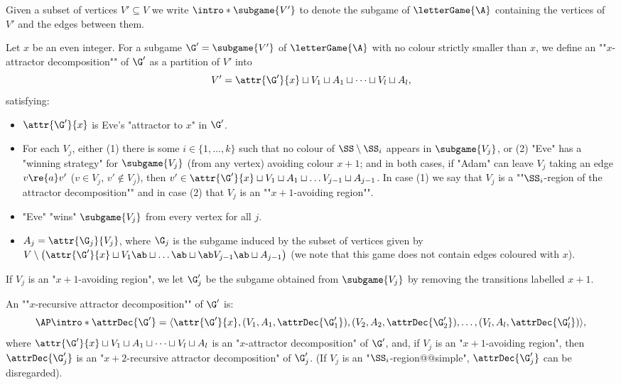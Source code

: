 \documentclass{theoretics}
\begin{document}
\AP Given a subset of vertices $V'\subseteq V$ we write $\intro*\subgame{V'}$ to denote the subgame of $\letterGame{\A}$ containing the vertices of $V'$ and the edges between them.

\AP Let $x$ be an even integer. For a subgame $\G' = \subgame{V'}$ of $\letterGame{\A}$ with no colour strictly smaller than $x$, we define an ""$x$-attractor decomposition"" of $\G'$ as  a partition of $V'$ into 
\[V' =\attr{\G'}{x} \sqcup V_1 \sqcup A_1 \sqcup \dots\sqcup V_l \sqcup A_l,\] 
satisfying:
\begin{itemize}
	\item \AP $\attr{\G'}{x}$ is Eve's "attractor to $x$" in $\G'$. 
	
	\item For each $V_j$, either (1) there is some $i\in \{1,\dots, k\}$ such that no colour of $\SS\setminus \SS_i$ appears in $\subgame{V_j}$, or (2) "Eve" has a "winning strategy" for $\subgame{V_j}$ (from any vertex) avoiding colour $x+1$; and in both cases, if "Adam" can leave $V_j$ taking an edge $v\re{a} v'$ ($v\in V_j$, $v'\notin V_j$), then $v'\in \attr{\G'}{x} \sqcup V_1 \sqcup A_1 \sqcup \dots  V_{j-1} \sqcup A_{j-1}$.
	In case (1) we say that $V_j$ is a ""$\SS_i$-region of the attractor decomposition"" and in case (2) that $V_j$ is an ""$x+1$-avoiding region"".
	
	\item "Eve" "wins" $\subgame{V_j}$ from every vertex for all $j$.
	
	\item $A_j = \attr{\G_j}{V_j}$, where $\G_j$ is the subgame induced by the subset of vertices given by $V\setminus \left(\attr{\G'}{x} \sqcup V_1 \ab \sqcup \dots \ab\sqcup\ab V_{j-1}\ab \sqcup A_{j-1}\right)$ (we note that this game does not contain edges coloured with $x$).
		
\end{itemize}

If $V_j$ is an "$x+1$-avoiding region", we let $\G_j'$ be the subgame obtained from $\subgame{V_j}$ by removing the transitions labelled $x+1$. %

\AP An ""$x$-recursive attractor decomposition"" of $\G'$ is:
\[ \AP \intro*\attrDec{\G'} = \langle \attr{\G'}{x}, (V_1,A_1, \attrDec{\G_1'}), (V_2,A_2, \attrDec{\G_2'}),\dots , (V_l,A_l, \attrDec{\G_l'})\rangle, \]
where $\attr{\G'}{x} \sqcup V_1 \sqcup A_1 \sqcup \dots\sqcup V_l \sqcup A_l$ is an "$x$-attractor decomposition" of $\G'$, and, if $V_j$ is an "$x+1$-avoiding region", then $\attrDec{\G_j'}$ is an "$x+2$-recursive attractor decomposition" of $\G_j'$. (If $V_j$ is an "$\SS_i$-region@@simple", $\attrDec{\G_j'}$ can be disregarded).
\end{document}
